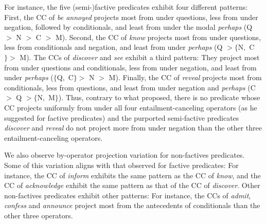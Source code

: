 \documentclass[a4paper,12pt,twoside]{article}
\begin{document}
        For instance, the five (semi-)factive predicates exhibit four different patterns:
        First, the CC of \emph{be annoyed} projects
        most from under questions, less from under negation, followed by conditionals, and least from under the modal \emph{perhaps} (\textcolor{op-q-color}{Q} $>$ \textcolor{op-n-color}{N} $>$ \textcolor{op-c-color}{C} $>$ \textcolor{op-m-color}{M}).
        Second, the CC of \emph{know} projects most from under questions, less from conditionals and negation, and least from under {\em perhaps} (\textcolor{op-q-color}{Q} $> \{$\textcolor{op-n-color}{N}$,$ \textcolor{op-c-color}{C}$\} >$ \textcolor{op-m-color}{M}).
        The CCs of \emph{discover} and \emph{see} exhibit a third pattern: They project most from under questions and conditionals, less from under negation, and least from under \emph{perhaps} ($\{$\textcolor{op-q-color}{Q}$,$ \textcolor{op-c-color}{C}$\}>$ \textcolor{op-n-color}{N} $>$ \textcolor{op-m-color}{M}).
        Finally, the CC of \emph{reveal} projects most from conditionals, less from questions, and least from under negation and \emph{perhaps} (\textcolor{op-c-color}{C} $>$ \textcolor{op-q-color}{Q}  $> \{$\textcolor{op-n-color}{N}$,$ \textcolor{op-m-color}{M}$\}$).
        Thus, contrary to what \citealt{karttunen_observations_1971} proposed, there is no predicate whose CC projects uniformly from under all four entailment-canceling operators (as he suggested for factive predicates) and the purported semi-factive predicates  \emph{discover} and \emph{reveal} do not project more from under negation than the other three entailment-canceling operators.
        
        We also observe by-operator projection variation for non-factives predicates. Some of this variation aligns with that observed for factive predicates: For instance, the CC of \emph{inform} exhibits the same pattern as the CC of \emph{know}, and the CC of \emph{acknowledge} exhibit the same pattern as that of the CC of \emph{discover}. Other non-factives predicates exhibit other patterns: For instance, the CCs of \emph{admit}, \emph{confess} and \emph{announce} project most from the antecedents of conditionals than the other three operators. 
\end{document}
